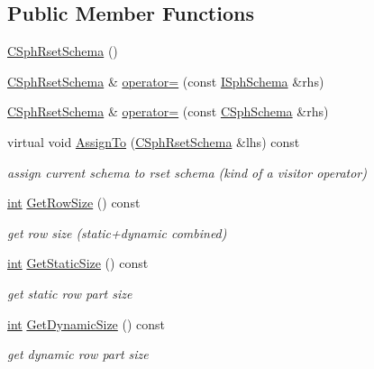 \subsection*{Public Member Functions}
\begin{DoxyCompactItemize}
\item 
\hyperlink{classCSphRsetSchema_a3e6ad23e5c4293e8c345935125515df4}{C\-Sph\-Rset\-Schema} ()
\item 
\hyperlink{classCSphRsetSchema}{C\-Sph\-Rset\-Schema} \& \hyperlink{classCSphRsetSchema_a6db6ca4ae7261495621b440dc4067fd5}{operator=} (const \hyperlink{classISphSchema}{I\-Sph\-Schema} \&rhs)
\item 
\hyperlink{classCSphRsetSchema}{C\-Sph\-Rset\-Schema} \& \hyperlink{classCSphRsetSchema_a8ce74003c05e66ed5ddd6b4358789744}{operator=} (const \hyperlink{classCSphSchema}{C\-Sph\-Schema} \&rhs)
\item 
virtual void \hyperlink{classCSphRsetSchema_aa2b221041823484dd8f9498bd6ef0f6b}{Assign\-To} (\hyperlink{classCSphRsetSchema}{C\-Sph\-Rset\-Schema} \&lhs) const 
\begin{DoxyCompactList}\small\item\em assign current schema to rset schema (kind of a visitor operator) \end{DoxyCompactList}\item 
\hyperlink{sphinxexpr_8cpp_a4a26e8f9cb8b736e0c4cbf4d16de985e}{int} \hyperlink{classCSphRsetSchema_aa55a3cd92bb19d13f45a94f0218406a9}{Get\-Row\-Size} () const 
\begin{DoxyCompactList}\small\item\em get row size (static+dynamic combined) \end{DoxyCompactList}\item 
\hyperlink{sphinxexpr_8cpp_a4a26e8f9cb8b736e0c4cbf4d16de985e}{int} \hyperlink{classCSphRsetSchema_a748c821c4ee30cfd81a152bc998e7052}{Get\-Static\-Size} () const 
\begin{DoxyCompactList}\small\item\em get static row part size \end{DoxyCompactList}\item 
\hyperlink{sphinxexpr_8cpp_a4a26e8f9cb8b736e0c4cbf4d16de985e}{int} \hyperlink{classCSphRsetSchema_a43f0a816f9a01307f859b8d18ac5946b}{Get\-Dynamic\-Size} () const 
\begin{DoxyCompactList}\small\item\em get dynamic row part size \end{DoxyCompactList}\item 

\end{DoxyCompactItemize}
